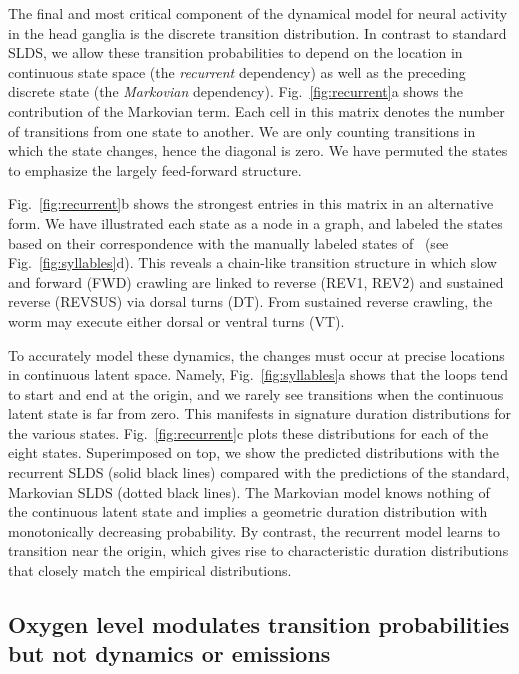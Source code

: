 \documentclass[11pt]{article}
\begin{document}
The final and most critical component of the dynamical model for
neural activity in the head ganglia is the discrete transition
distribution.  In contrast to standard SLDS, we allow these transition
probabilities to depend on the location in continuous state space (the
\emph{recurrent} dependency) as well as the preceding discrete state
(the \emph{Markovian} dependency).  Fig.~\ref{fig:recurrent}a shows
the contribution of the Markovian term.  Each cell in this matrix
denotes the number of transitions from one state to another. We are
only counting transitions in which the state changes, hence the
diagonal is zero.  We have permuted the states to emphasize the
largely feed-forward structure.

Fig.~\ref{fig:recurrent}b shows the strongest entries in this matrix
in an alternative form.  We have illustrated each state as a node in a
graph, and labeled the states based on their correspondence with the
manually labeled states of~\citet{kato2015global} (see
Fig.~\ref{fig:syllables}d).  This reveals a chain-like transition
structure in which slow and forward (\textsf{FWD}) crawling are linked
to reverse (\textsf{REV1}, \textsf{REV2}) and sustained reverse
(\textsf{REVSUS}) via dorsal turns (\textsf{DT}). From sustained
reverse crawling, the worm may execute either dorsal or ventral turns
(\textsf{VT}).

To accurately model these dynamics, the changes must occur at precise
locations in continuous latent space.  Namely,
Fig.~\ref{fig:syllables}a shows that the loops tend to start and end
at the origin, and we rarely see transitions when the continuous
latent state is far from zero. This manifests in signature duration
distributions for the various states.  Fig.~\ref{fig:recurrent}c plots
these distributions for each of the eight states.  Superimposed on
top, we show the predicted distributions with the recurrent SLDS
(solid black lines) compared with the predictions of the standard,
Markovian SLDS (dotted black lines). The Markovian model knows nothing
of the continuous latent state and implies a geometric duration
distribution with monotonically decreasing probability. By contrast,
the recurrent model learns to transition near the origin, which
gives rise to characteristic duration distributions that closely
match the empirical distributions. 


\subsection*{Oxygen level modulates transition probabilities but not dynamics or emissions}
\end{document}
